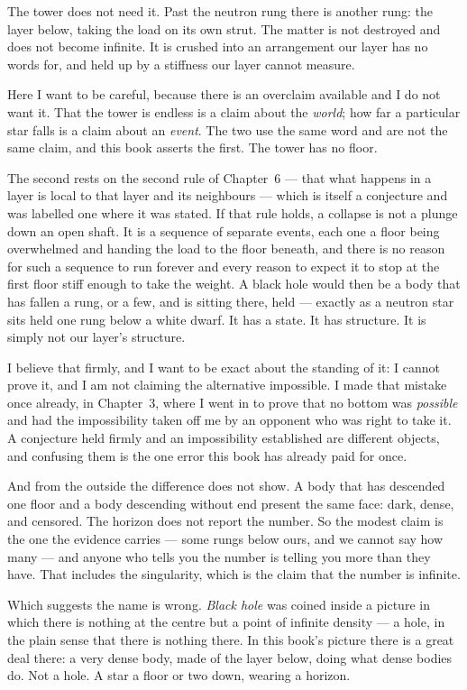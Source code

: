\documentclass[fontsize=11pt,paper=a4,pagesize=auto,parskip=half-]{scrbook}
\begin{document}
The tower does not need it. Past the neutron rung there is another rung: the layer below, taking the load on its own strut. The matter is not destroyed and does not become infinite. It is crushed into an arrangement our layer has no words for, and held up by a stiffness our layer cannot measure.

Here I want to be careful, because there is an overclaim available and I do not want it. That the tower is endless is a claim about the \emph{world}; how far a particular star falls is a claim about an \emph{event}. The two use the same word and are not the same claim, and this book asserts the first. The tower has no floor.

The second rests on the second rule of Chapter~6 --- that what happens in a layer is local to that layer and its neighbours --- which is itself a conjecture and was labelled one where it was stated. If that rule holds, a collapse is not a plunge down an open shaft. It is a sequence of separate events, each one a floor being overwhelmed and handing the load to the floor beneath, and there is no reason for such a sequence to run forever and every reason to expect it to stop at the first floor stiff enough to take the weight. A black hole would then be a body that has fallen a rung, or a few, and is sitting there, held --- exactly as a neutron star sits held one rung below a white dwarf. It has a state. It has structure. It is simply not our layer's structure.

I believe that firmly, and I want to be exact about the standing of it: I cannot prove it, and I am not claiming the alternative impossible. I made that mistake once already, in Chapter~3, where I went in to prove that no bottom was \emph{possible} and had the impossibility taken off me by an opponent who was right to take it. A conjecture held firmly and an impossibility established are different objects, and confusing them is the one error this book has already paid for once.

And from the outside the difference does not show. A body that has descended one floor and a body descending without end present the same face: dark, dense, and censored. The horizon does not report the number. So the modest claim is the one the evidence carries --- some rungs below ours, and we cannot say how many --- and anyone who tells you the number is telling you more than they have. That includes the singularity, which is the claim that the number is infinite.

Which suggests the name is wrong. \emph{Black hole} was coined inside a picture in which there is nothing at the centre but a point of infinite density --- a hole, in the plain sense that there is nothing there. In this book's picture there is a great deal there: a very dense body, made of the layer below, doing what dense bodies do. Not a hole. A star a floor or two down, wearing a horizon.
\end{document}
